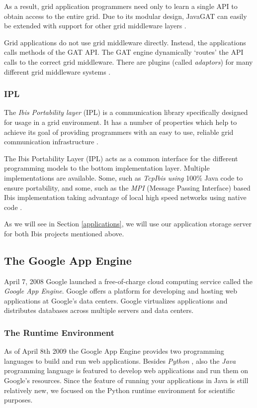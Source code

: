 As a result, grid application programmers need only to learn a single API to
obtain access to the entire grid. Due to its modular design, JavaGAT can easily
be extended with support for other grid middleware layers \cite{javagat-www}.

Grid applications do not use grid middleware directly. Instead, the
applications calls methods of the GAT API. The GAT engine dynamically `routes'
the API calls to the correct grid middleware. There are plugins (called
\emph{adaptors}) for many different grid middleware systems \cite{javagat-www}.

\subsubsection{IPL}
The \emph{Ibis Portability layer} (IPL) is a communication library specifically
designed for usage in a grid environment. It has a number of properties which
help to achieve its goal of providing programmers with an easy to use, reliable
grid communication infrastructure \cite{ibis-www}.

The Ibis Portability Layer (IPL) acts as a common interface for the different
programming models to the bottom implementation layer. Multiple implementations
are available. Some, such as \emph{TcpIbis using} 100\% Java code to ensure
portability, and some, such as the \emph{MPI} (Message Passing Interface) based
Ibis implementation taking advantage of local high speed networks using native
code \cite{ibis-www}.

As we will see in Section \ref{applications}, we will use our application
storage server for both Ibis projects mentioned above.

\subsection{The Google App Engine}
\label{related-appengine}
April 7, 2008 Google launched a free-of-charge cloud computing service called
the \emph{Google App Engine}. Google offers a platform for developing and
hosting web applications at Google's data centers. Google virtualizes
applications and distributes databases across multiple servers and data centers.

\subsubsection{The Runtime Environment}
As of April 8th 2009 \cite{app-engine-java} the Google App Engine provides two
programming languages to build and run web applications. Besides \emph{Python}
\cite{python-www}, also the \emph{Java} \cite{java-www} programming language is
featured to develop web applications and run them on Google's resources. Since
the feature of running your applications in Java is still relatively new, we
focused on the Python runtime environment for scientific purposes.

